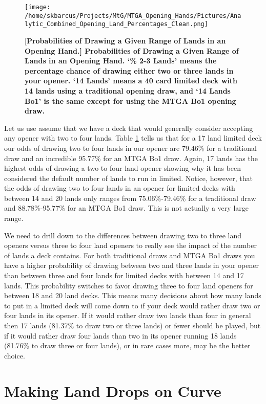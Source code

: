 \documentclass[oneside]{book}   %
\begin{document}
 	\begin{figure}[!ht]
	\centering
	\centerline{\texttt{[image: /home/skbarcus/Projects/MtG/MTGA\_Opening\_Hands/Pictures/Analytic\_Combined\_Opening\_Land\_Percentages\_Clean.png]}}
	[\bf{Probabilities of Drawing a Given Range of Lands in an Opening Hand.}]{
	{\bf{Probabilities of Drawing a Given Range of Lands in an Opening Hand.}} `\% 2-3 Lands' means the percentage chance of drawing either two or three lands in your opener. `14 Lands' means a 40 card limited deck with 14 lands using a traditional opening draw, and `14 Lands Bo1' is the same except for using the MTGA Bo1 opening draw.}
	\label{fig:combined}
	\end{figure}	
	
Let us use assume that we have a deck that would generally consider accepting any opener with two to four lands. Table \ref{fig:combined} tells us that for a 17 land limited deck our odds of drawing two to four lands in our opener are 79.46\% for a traditional draw and an incredible 95.77\% for an MTGA Bo1 draw. Again, 17 lands has the highest odds of drawing a two to four land opener showing why it has been considered the default number of lands to run in limited. Notice, however, that the odds of drawing two to four lands in an opener for limited decks with between 14 and 20 lands only ranges from 75.06\%-79.46\% for a traditional draw and 88.78\%-95.77\% for an MTGA Bo1 draw. This is not actually a very large range. 

We need to drill down to the differences between drawing two to three land openers versus three to four land openers to really see the impact of the number of lands a deck contains. For both traditional draws and MTGA Bo1 draws you have a higher probability of drawing between two and three lands in your opener than between three and four lands for limited decks with between 14 and 17 lands. This probability switches to favor drawing three to four land openers for between 18 and 20 land decks. This means many decisions about how many lands to put in a limited deck will come down to if your deck would rather draw two or four lands in its opener. If it would rather draw two lands than four in general then 17 lands (81.37\% to draw two or three lands) or fewer should be played, but if it would rather draw four lands than two in its opener running 18 lands (81.76\% to draw three or four lands), or in rare cases more, may be the better choice.  

\section{Making Land Drops on Curve}
\label{curve}
\end{document}
